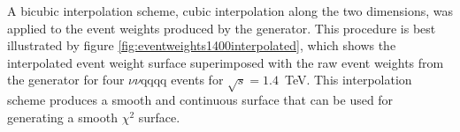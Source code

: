 A bicubic interpolation scheme, cubic interpolation along the two dimensions, was applied to the event weights produced by the generator.  This procedure is best illustrated by figure \ref{fig:eventweights1400interpolated}, which shows the interpolated event weight surface superimposed with the raw event weights from the generator for four $\nu\nu\text{qqqq}$ events for $\sqrt{s}=1.4$~TeV.  This interpolation scheme produces a smooth and continuous surface that can be used for generating a smooth $\chi^{2}$ surface.  

\begin{figure}[h!]
\centering
{}
 \hfill
{}

\end{figure}
